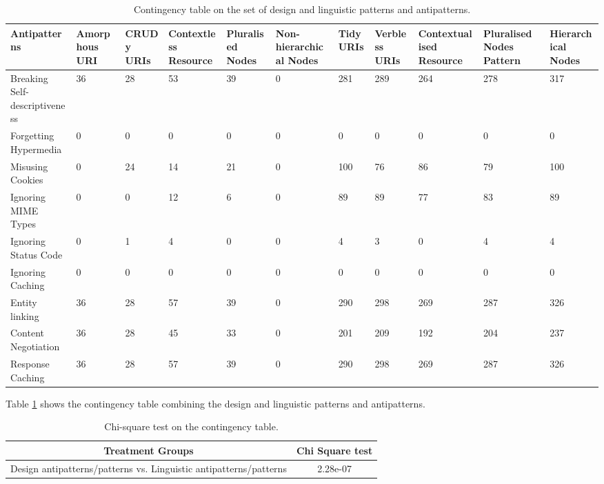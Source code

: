 \begin{table}[ht!]
\scriptsize
\setlength{\tabcolsep}{1.5pt}
\begin{tabular}{|p{18mm}|p{14mm}|p{9mm}|p{13mm}|p{11mm}|p{14mm}|p{7mm}|p{10mm}|p{17mm}|p{12mm}|p{14mm}|}
\hline Antipatterns & Amorphous URI & CRUDy URIs & Contextless Resource & Pluralised Nodes & Non-hierarchical Nodes & Tidy URIs & Verbless URIs & Contextualised Resource & Pluralised Nodes Pattern & Hierarchical Nodes  \\
\hline 
 Breaking Self-descriptiveness &
 36 &
 28 &
 53 &
 39 &
 0 &
 281 &
 289 &
 264 &
 278 &
 317
\\ \hline
 Forgetting Hypermedia &
 0 &
 0 &
 0 &
 0 &
 0 &
 0 &
 0 &
 0 &
 0 &
 0
\\ \hline
 Misusing Cookies &
 0 &
 24 &
 14 &
 21 &
 0 &
 100 &
 76 &
 86 &
 79 &
 100
\\ \hline
Ignoring MIME Types &
 0 &
 0 &
 12 &
 6 &
 0 &
 89 &
 89 &
 77 &
 83 &
 89
\\ \hline
Ignoring Status Code &
 0 &
 1 &
 4 &
 0 &
 0 &
 4 &
 3 &
 0 &
 4 &
 4
\\ \hline
Ignoring Caching &
 0 &
 0 &
 0 &
 0 &
 0 &
 0 &
 0 &
 0 &
 0 &
 0
\\ \hline
Entity linking &
 36 &
 28 &
 57 &
 39 &
 0 &
 290 &
 298 &
 269 &
 287 &
 326
\\ \hline
Content Negotiation &
 36 &
 28 &
 45 &
 33 &
 0 &
 201 &
 209 &
 192 &
 204 &
 237
\\ \hline
Response Caching &
 36 &
 28 &
 57 &
 39 &
 0 &
 290 &
 298 &
 269 &
 287 &
 326
\\ \hline
\end{tabular}
\caption{Contingency table on the set of design and linguistic patterns and antipatterns.}
\label{contingencytable}
\end{table}

Table \ref{contingencytable} shows the contingency table combining the design and linguistic patterns and antipatterns.

\begin{table}[ht!]
\centering
\begin{tabular}{|c|c|}
    \hline
   Treatment Groups  & Chi Square test \\ \hline
   Design antipatterns/patterns vs. Linguistic antipatterns/patterns  & 2.28e-07 \\ \hline
\end{tabular}
\caption{Chi-square test on the contingency table.}
\label{actual:Chi-squaretest}
\end{table}

